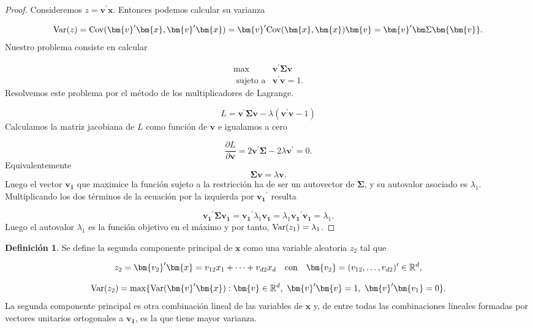 \documentclass[
  a4paper,
  oneside]{scrbook}
\theoremstyle{definition}
\newtheorem{definition}{Definición}[chapter]
\theoremstyle{definition}
\theoremstyle{definition}
\theoremstyle{definition}
\theoremstyle{remark}
\begin{document}
\begin{proof}
Consideremos \(z=\bm{v}^{\prime}\bm{x}\). Entonces podemos
calcular su varianza

\[\textnormal{Var}(z)=\textnormal{Cov}(\bm{v}^{\prime}\bm{x},\bm{v}^{\prime}\bm{x})=\bm{v}^{\prime}\textnormal{Cov}(\bm{x},\bm{x})\bm{v}=\bm{v}^{\prime}\bm\Sigma \bm{\bm{v}}.\]
Nuestro problema consiste en calcular

\[\begin{array}{rl}
\max & \bm{v}^{\prime}\bm\Sigma \bm{v} \\
\mbox{ sujeto a} & \bm{v}^{\prime}\bm{v}=1.
\end{array}\] Resolvemos este problema por el método de los
multiplicadores de Lagrange.

\[L=\bm{v}^{\prime}\bm\Sigma \bm{v}-\lambda(\bm{v}^{\prime}\bm{v}-1)\]
Calculamos la matriz jacobiana de \(L\) como función de \(\bm{v}\) e
igualamos a cero

\[\frac{\partial L}{\partial \bm{v}}=2\bm{v}^{\prime}\bm\Sigma-2\lambda \bm{v}^{\prime}=0.\]
Equivalentemente \[\bm\Sigma \bm{v}=\lambda \bm{v}.\] Luego el vector
\(\bm{v_1}\) que maximice la función sujeto a la restricción ha de ser un
autovector de \(\bm\Sigma\), y su autovalor asociado es \(\lambda_1\).
Multiplicando los dos términos de la ecuación por la izquierda por \(\bm{v_1}^{\prime}\) resulta

\[\bm{v_1}^{\prime}\bm\Sigma \bm{v_1}=\bm{v_1}^{\prime}\lambda_1 \bm{v_1}=\lambda_1 \bm{v_1}^{\prime} \bm{v_1}=\lambda_1.\]
Luego el autovalor \(\lambda_1\) es la función objetivo en el máximo y por
tanto, \(\textnormal{Var}(z_1)=\lambda_1\).
\end{proof}

\begin{definition}
\protect\hypertarget{def:unnamed-chunk-73}{}\label{def:unnamed-chunk-73}Se define la segunda componente principal de \(\bm{x}\) como una variable
aleatoria \(z_2\) tal que

\[z_2=\bm{v_2}^{\prime}\bm{x}=v_{12}x_1+\cdots+v_{d2}x_d\ \ \ \mbox{con}\ \ \ \bm{v_2}=(v_{12},\ldots,v_{d2})^{\prime}
\in {\Bbb R}^d,\]

\[\textnormal{Var}(z_2)=\max\{\textnormal{Var}(\bm{v}^{\prime}\bm{x}):\bm{v}\in {\Bbb R}^d,\ \bm{v}^{\prime}\bm{v}=1,\ \bm{v}^{\prime}\bm{v_1}=0\}.\]
La segunda componente principal es otra combinación lineal de las
variables de \(\bm{x}\) y, de entre todas las combinaciones lineales
formadas por vectores unitarios ortogonales a \(\bm{v_1}\), es la que
tiene mayor varianza.
\end{definition}
\end{document}
